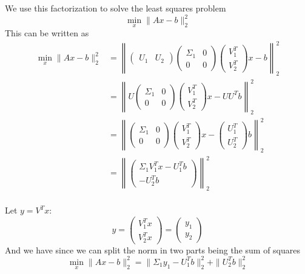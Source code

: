 We use this factorization to solve the least squares problem
\[
    \min_x \| Ax - b \|_2^2
\]
This can be written as
\[
\begin{aligned}
    \min_x \| Ax - b \|_2^2 &=
    \left\|
        \begin{pmatrix} U_1 & U_2 \end{pmatrix}
        \begin{pmatrix} \Sigma_1 & 0 \\ 0 & 0 \end{pmatrix}
        \begin{pmatrix} V_1^T \\ V_2^T \end{pmatrix}
        x - b
    \right\|_2^2 \\
    & = \left\|
        U \begin{pmatrix}
        \Sigma_1 & 0 \\
        0 & 0 
        \end{pmatrix}
        \begin{pmatrix}
            V_1^T \\
            V_2^T
        \end{pmatrix}
        x - UU^T b
    \right\|_2^2 \\
    & = \left\|
    \begin{pmatrix}
        \Sigma_1 & 0 \\
        0 & 0 
        \end{pmatrix}
        \begin{pmatrix}
            V_1^T \\
            V_2^T
        \end{pmatrix}
        x - 
        \begin{pmatrix}
            U_1^T \\
            U_2^T
        \end{pmatrix}b
    \right\|_2^2 \\
    & = \left\|
        \begin{pmatrix}
            \Sigma_1 V_1^T x - U_1^T b\\
            - U_2^T b
        \end{pmatrix}
    \right\|_2^2 \\
\end{aligned}
\]

Let $y = V^T x$:
\[
y = \begin{pmatrix}
V_1^Tx \\
V_2^Tx
\end{pmatrix} = \begin{pmatrix}
y_1 \\
y_2
\end{pmatrix}
\]
And we have since we can split the norm in two parts being the sum of squares
\[
\min_x \| Ax - b \|_2^2 = \| \Sigma_1 y_1 - U_1^T b \|_2^2 + \| U_2^T b \|_2^2
\]

